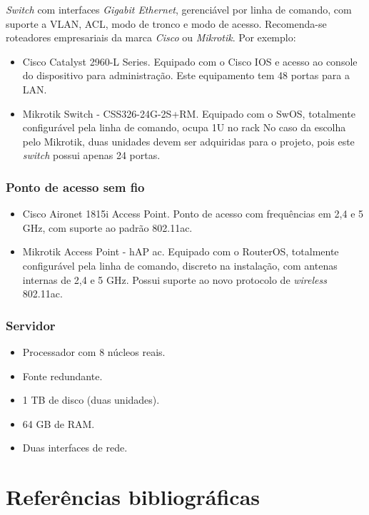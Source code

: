 \documentclass[	DIV=calc,%
							paper=a4,%
							fontsize=12pt,%
							onecolumn]{scrartcl}	 					%
\begin{document}
\textit{Switch} com interfaces \textit{Gigabit Ethernet}, gerenciável por linha de comando, com suporte a VLAN, ACL, modo de tronco e modo de acesso. Recomenda-se roteadores empresariais da marca \textit{Cisco} ou \textit{Mikrotik}. Por exemplo:

\begin{itemize}
	\item{Cisco Catalyst 2960-L Series}. Equipado com o Cisco IOS e acesso ao console do dispositivo para administração. Este equipamento tem 48 portas para a LAN.
	\item{Mikrotik Switch - CSS326-24G-2S+RM}. Equipado com o SwOS, totalmente configurável pela linha de comando, ocupa 1U no rack No caso da escolha pelo Mikrotik, duas unidades devem ser adquiridas para o projeto, pois este \textit{switch} possui apenas 24 portas. 
\end{itemize}

\subsubsection{Ponto de acesso sem fio}
\begin{itemize}
	\item{Cisco Aironet 1815i Access Point}. Ponto de acesso com frequências em 2,4 e 5 GHz, com suporte ao padrão 802.11ac.
	\item{Mikrotik Access Point - hAP ac}. Equipado com o RouterOS, totalmente configurável pela linha de comando, discreto  na instalação, com antenas internas de 2,4 e 5 GHz. Possui suporte ao novo protocolo de \textit{wireless} 802.11ac.  
\end{itemize}

\subsubsection{Servidor}
\begin{itemize}
	\item Processador com 8 núcleos reais.
	\item Fonte redundante.
	\item 1 TB de disco (duas unidades).
	\item 64 GB de RAM.
	\item Duas interfaces de rede.
\end{itemize}

\pagebreak
\section{Referências bibliográficas}

\renewcommand\refname{} %

  
\end{document}

